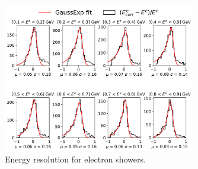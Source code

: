 \documentclass[a4paper]{article}
\begin{document}
 \begin{figure}[ht]
\begin{center}
\includegraphics[width=0.75\textwidth]{ereco/elec_eres_binned.pdf}
\caption{\label{fig:eres:elec:binned}Energy resolution for electron showers.}
\end{center}
\end{figure}
 
 \newpage
\end{document}
